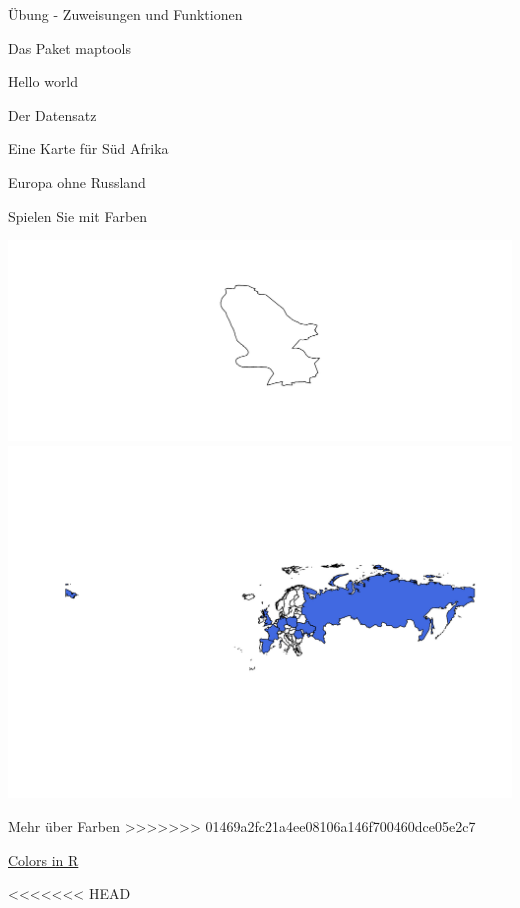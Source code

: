 \documentclass[ignorenonframetext,]{beamer}
\newenvironment{Shaded}{\begin{snugshade}}{\end{snugshade}}
\newcommand{\DataTypeTok}[1]{\textcolor[rgb]{0.74,0.68,0.62}{\underline{#1}}}
\newcommand{\KeywordTok}[1]{\textcolor[rgb]{0.26,0.66,0.93}{\textbf{#1}}}
\newcommand{\NormalTok}[1]{\textcolor[rgb]{0.74,0.68,0.62}{#1}}
\newcommand{\OperatorTok}[1]{\textcolor[rgb]{0.74,0.68,0.62}{#1}}
\newcommand{\StringTok}[1]{\textcolor[rgb]{0.02,0.61,0.04}{#1}}
\begin{document}
\begin{frame}[fragile]{Übung - Zuweisungen und Funktionen}
\begin{frame}[fragile]{Das Paket maptools}
\begin{frame}[fragile]{Hello world}
\begin{frame}[fragile]{Der Datensatz}
\begin{frame}[fragile]{Eine Karte für Süd Afrika}
\begin{frame}{Europa ohne Russland}
\end{frame}

\begin{frame}{Spielen Sie mit Farben}

\includegraphics{Geomedizin_files/figure-beamer/unnamed-chunk-98-1.pdf}
\includegraphics{Geomedizin_files/figure-beamer/unnamed-chunk-98-2.pdf}

\end{frame}

\begin{frame}{Mehr über Farben}
>>>>>>> 01469a2fc21a4ee08106a146f700460dce05e2c7

\href{http://www.stat.columbia.edu/~tzheng/files/Rcolor.pdf}{Colors in
R}

<<<<<<< HEAD
\begin{Shaded}
\end{Shaded}


\end{frame}
\end{frame}
\end{frame}
\end{frame}
\end{frame}
\end{frame}
\end{document}
